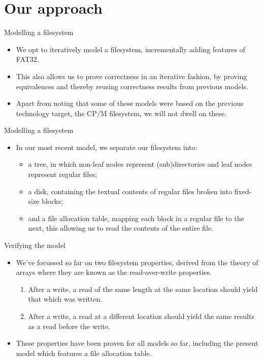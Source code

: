 \documentclass{beamer}
\begin{document}
\section{Our approach}

\begin{frame}{Modelling a filesystem}
  \begin{itemize}
  \item We opt to iteratively model a filesystem, incrementally
    adding features of FAT32.
  \item This also allows us to prove correctness in an iterative
    fashion, by proving equivalences and thereby reusing correctness
    results from previous models.
  \item Apart from noting that some of these models were based on
    the previous technology target, the CP/M filesystem, we will not
    dwell on these.
  \end{itemize}
\end{frame}

\begin{frame}{Modelling a filesystem}
  \begin{itemize}
  \item In our most recent model, we separate our filesystem into:
    \begin{itemize}
    \item a tree, in which non-leaf nodes represent (sub)directories
      and leaf nodes represent regular files;
    \item a disk, containing the textual contents of regular files
      broken into fixed-size blocks;
    \item and a file allocation table, mapping each block in a regular
      file to the next, this allowing us to read the contents of the
      entire file.
    \end{itemize}
  \end{itemize}
\end{frame}

\begin{frame}{Verifying the model}
  \begin{itemize}
  \item We've focussed so far on two filesystem properties, derived
    from the theory of arrays where they are known as the
    read-over-write properties.
    \begin{enumerate}
    \item After a write, a read of the same length at the same
      location should yield that which was written.
    \item After a write, a read at a different location should yield
      the same results as a read before the write.
    \end{enumerate}
  \item These properties have been proven for all models so far,
    including the present model which features a file allocation
    table.
  \end{itemize}
\end{frame}
\end{document}
